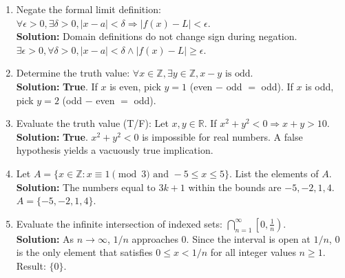 \documentclass[11pt]{article}
\begin{document}
\begin{enumerate}[label=(\roman*)]
    \item Negate the formal limit definition: $\forall \epsilon > 0, \exists \delta > 0, |x-a|<\delta \Rightarrow |f(x)-L|<\epsilon$.\\
    \textbf{Solution:} Domain definitions do not change sign during negation. \\
    $\exists \epsilon > 0, \forall \delta > 0, |x-a|<\delta \wedge |f(x)-L| \geq \epsilon$.

    \item Determine the truth value: $\forall x \in \mathbb{Z}, \exists y \in \mathbb{Z}, x-y \text{ is odd}$.\\
    \textbf{Solution:} \textbf{True}. If $x$ is even, pick $y=1$ (even $-$ odd $=$ odd). If $x$ is odd, pick $y=2$ (odd $-$ even $=$ odd).

    \item Evaluate the truth value (T/F): Let $x,y \in \mathbb{R}$. If $x^2+y^2 < 0 \Rightarrow x+y > 10$.\\
    \textbf{Solution:} \textbf{True}. $x^2+y^2 < 0$ is impossible for real numbers. A false hypothesis yields a vacuously true implication.

    \item Let $A = \{x \in \mathbb{Z} : x \equiv 1 \pmod 3 \text{ and } -5 \leq x \leq 5\}$. List the elements of $A$.\\
    \textbf{Solution:} The numbers equal to $3k+1$ within the bounds are $-5, -2, 1, 4$. \\
    $A = \{-5, -2, 1, 4\}$.

    \item Evaluate the infinite intersection of indexed sets: $\bigcap_{n=1}^\infty \left[0, \frac{1}{n}\right)$.\\
    \textbf{Solution:} As $n \to \infty$, $1/n$ approaches 0. Since the interval is open at $1/n$, 0 is the only element that satisfies $0 \leq x < 1/n$ for all integer values $n \geq 1$. \\
    Result: $\{0\}$.
\end{enumerate}
\end{document}
